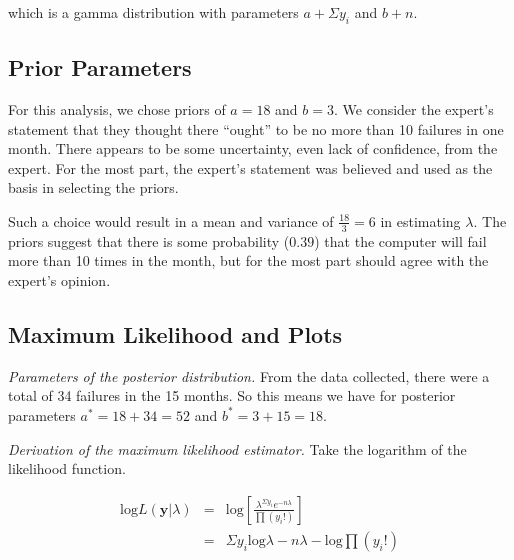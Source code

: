 \documentclass[12pt]{article}
\begin{document}
\noindent which is a gamma distribution with parameters $a+\Sigma y_i$ and $b+n$.  %

\subsection{Prior Parameters}

\noindent For this analysis, we chose priors of $a=18$ and $b=3$.  We consider the expert's statement that they thought there ``ought'' to be no more than 10 failures in one month.  There appears to be some uncertainty, even lack of confidence, from the expert.  For the most part, the expert's statement was believed and used as the basis in selecting the priors.
\bigskip

\noindent Such a choice would result in a mean and variance of $\frac{18}{3}=6$ in estimating $\lambda$.  The priors suggest that there is some probability ($0.39$) that the computer will fail more than 10 times in the month, but for the most part should agree with the expert's opinion.

\subsection{Maximum Likelihood and Plots}

%

\noindent \emph{Parameters of the posterior distribution.}  From the data collected, there were a total of 34 failures in the 15 months.  So this means we have for posterior parameters $a^*=18+34=52$ and $b^*=3+15=18$.
\bigskip

\noindent \emph{Derivation of the maximum likelihood estimator.}  Take the logarithm of the likelihood function.

\begin{eqnarray*}
\mathrm{log}L(\mathbf{y}|\lambda) &=& \mathrm{log}\left[\frac{\lambda^{\Sigma y_i}e^{-n\lambda}}{\prod (y_i!)}\right] \\
&=& \Sigma y_i\mathrm{log}\lambda-n\lambda-\mathrm{log}\prod (y_i!) \\
\end{eqnarray*}
\end{document}
